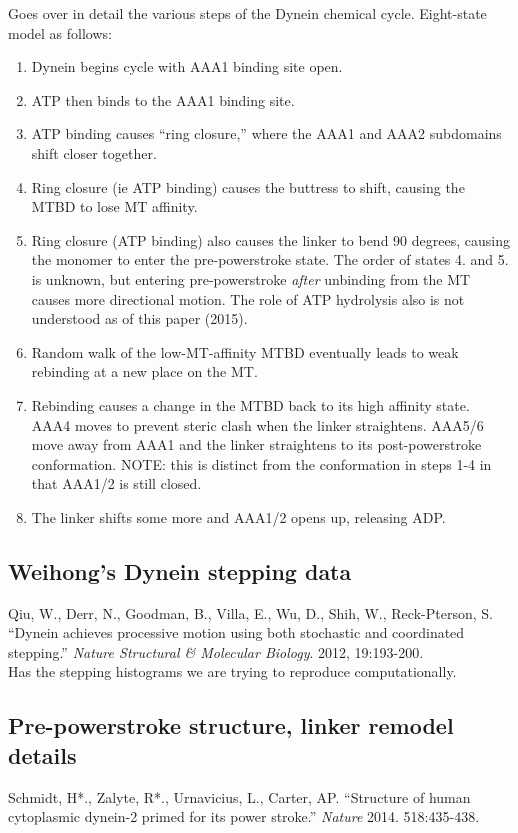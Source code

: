 \documentclass[10pt]{article} %
\begin{document}
Goes over in detail the various steps of the Dynein chemical cycle. Eight-state model as follows:\\

\begin{enumerate}
\item Dynein begins cycle with AAA1 binding site open.
\item ATP then binds to the AAA1 binding site.
\item ATP binding causes ``ring closure,'' where the AAA1 and AAA2 subdomains shift closer together.
\item Ring closure (ie ATP binding) causes the buttress to shift, causing the MTBD to lose MT affinity.
\item Ring closure (ATP binding) also causes the linker to bend 90 degrees, causing the monomer to enter the pre-powerstroke state. The order of states 4. and 5. is unknown, but entering pre-powerstroke \textit{after} unbinding from the MT causes more directional motion. The role of ATP hydrolysis also is not understood as of this paper (2015).
\item Random walk of the low-MT-affinity MTBD eventually leads to weak rebinding at a new place on the MT.
\item Rebinding causes a change in the MTBD back to its high affinity state. AAA4 moves to prevent steric clash when the linker straightens. AAA5/6 move away from AAA1 and the linker straightens to its post-powerstroke conformation. NOTE: this is distinct from the conformation in steps 1-4 in that AAA1/2 is still closed.
\item The linker shifts some more and AAA1/2 opens up, releasing ADP.
\end{enumerate}

\subsection{Weihong's Dynein stepping data}
Qiu, W., Derr, N., Goodman, B., Villa, E., Wu, D., Shih, W., Reck-Pterson, S. ``Dynein achieves processive motion using both stochastic and coordinated stepping.'' \textit{Nature Structural \& Molecular Biology}. 2012, 19:193-200.\\

Has the stepping histograms we are trying to reproduce computationally.

\subsection{Pre-powerstroke structure, linker remodel details}
Schmidt, H*., Zalyte, R*., Urnavicius, L., Carter, AP. ``Structure of human cytoplasmic dynein-2 primed for its power stroke.'' \textit{Nature} 2014. 518:435-438.
\end{document}
